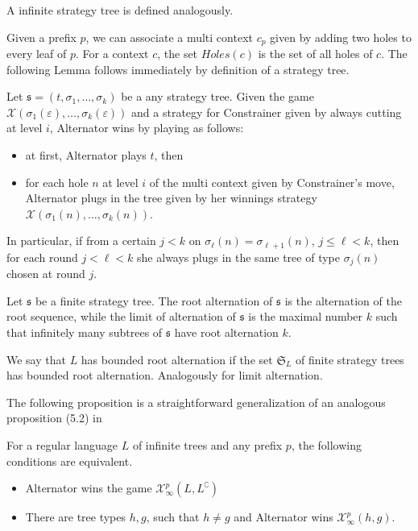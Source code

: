 A  infinite strategy tree is defined analogously.

Given a prefix $p$, we can associate a multi context $c_p$ given by adding two holes to every leaf of $p$. For a context $c$, the set $Holes(c)$ is the set of all holes of $c$. The following Lemma follows immediately by definition of a strategy tree.

\begin{lemma}\label{lemma:short_strategy}
Let $\mathfrak{s}=(t, \sigma_1, \dots, \sigma_k)$ be a any strategy tree. Given the  game $\mathcal{X}(\sigma_1(\varepsilon), \dots, \sigma_k(\varepsilon))$ and a strategy for Constrainer given by always cutting at level $i$, Alternator wins  by playing as follows:
\begin{itemize}
\item at first, Alternator plays $t$, then
\item for each hole $n$ at level $i$ of the multi context given by Constrainer's move, Alternator plugs in the tree given by her winnings strategy $\mathcal{X}(\sigma_1(n), \dots, \sigma_k(n))$.
\end{itemize}
In particular, if from a certain $j<k$ on $\sigma_\ell(n)=\sigma_{\ell+1}(n)$, $j\leq \ell < k$, then for each round $j< \ell < k$ she always plugs in the same tree of type $\sigma_j(n)$ chosen at round $j$.

\end{lemma}

Let $\mathfrak{s}$ be a finite strategy tree. The root alternation of $\mathfrak{s}$ is the alternation of the root sequence, while the limit of alternation of $\mathfrak{s}$ is the maximal number $k$ such that infinitely many subtrees of $\mathfrak{s}$ have root alternation $k$.

We say that $L$ has bounded root alternation if the set $\mathfrak{S}_L$ of finite strategy trees has bounded root alternation. Analogously for limit alternation.

The following proposition is a straightforward generalization of an analogous proposition (5.2) in \cite{bp}

\begin{proposition}\label{prop:tree_to_types}
 For a regular language $L$ of infinite trees and any prefix $p$, the following conditions are equivalent.
 \begin{itemize}
\item Alternator wins the game $\mathcal{X}^p_\infty(L, L^\complement)$ 
 \item  There are tree types $h, g$, such that $h\neq g$ and Alternator wins $\mathcal{X}^p_\infty(h, g)$.
 \end{itemize}
\end{proposition}

